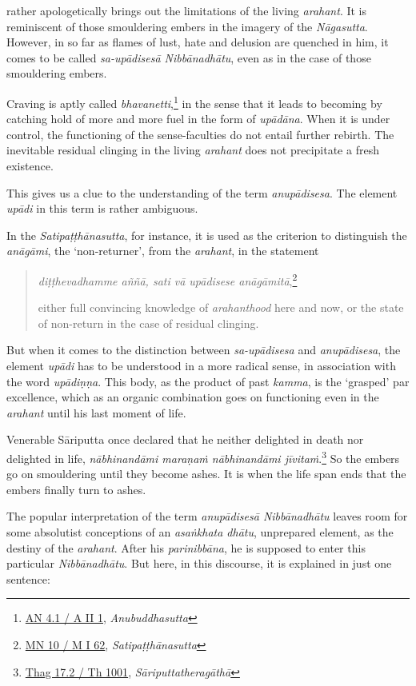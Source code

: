 rather apologetically brings out the limitations of the living \emph{arahant}. It is reminiscent of those smouldering embers in the imagery of the \emph{Nāgasutta}. However, in so far as flames of lust, hate and delusion are quenched in him, it comes to be called \emph{sa-upādisesā Nibbānadhātu}, even as in the case of those smouldering embers.

Craving is aptly called \emph{bhavanetti},\footnote{\href{https://suttacentral.net/an4.1/pli/ms}{AN 4.1 / A II 1}, \emph{Anubuddhasutta}} in the sense that it leads to becoming by catching hold of more and more fuel in the form of \emph{upādāna}. When it is under control, the functioning of the sense-faculties do not entail further rebirth. The inevitable residual clinging in the living \emph{arahant} does not precipitate a fresh existence.

This gives us a clue to the understanding of the term \emph{anupādisesa}. The element \emph{upādi} in this term is rather ambiguous.

In the \emph{Satipaṭṭhānasutta}, for instance, it is used as the criterion to distinguish the \emph{anāgāmi}, the `non-returner', from the \emph{arahant}, in the statement

\begin{quote}
\emph{diṭṭhevadhamme aññā, sati vā upādisese anāgāmitā},\footnote{\href{https://suttacentral.net/mn10/pli/ms}{MN 10 / M I 62}, \emph{Satipaṭṭhānasutta}}

either full convincing knowledge of \emph{arahanthood} here and now, or the state of non-return in the case of residual clinging.
\end{quote}

But when it comes to the distinction between \emph{sa-upādisesa} and \emph{anupādisesa}, the element \emph{upādi} has to be understood in a more radical sense, in association with the word \emph{upādiṇṇa}. This body, as the product of past \emph{kamma}, is the `grasped' par excellence, which as an organic combination goes on functioning even in the \emph{arahant} until his last moment of life.

Venerable Sāriputta once declared that he neither delighted in death nor delighted in life, \emph{nābhinandāmi maraṇaṁ nābhinandāmi jīvitaṁ}.\footnote{\href{https://suttacentral.net/thag17.2/pli/ms}{Thag 17.2 / Th 1001}, \emph{Sāriputtatheragāthā}} So the embers go on smouldering until they become ashes. It is when the life span ends that the embers finally turn to ashes.

The popular interpretation of the term \emph{anupādisesā Nibbānadhātu} leaves room for some absolutist conceptions of an \emph{asaṅkhata dhātu}, unprepared element, as the destiny of the \emph{arahant}. After his \emph{parinibbāna}, he is supposed to enter this particular \emph{Nibbānadhātu}. But here, in this discourse, it is explained in just one sentence:

